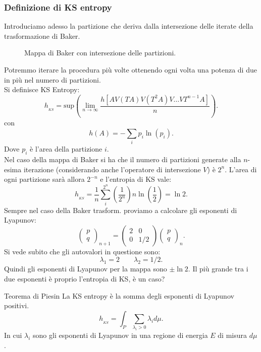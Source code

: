 \subsubsection{Definizione di KS entropy}%
\label{subsub:Definizione di KS entropy}
Introduciamo adesso la partizione che deriva dalla intersezione delle iterate della trasformazione di Baker.
\begin{figure}[H]
    \centering
    \caption{\scriptsize Mappa di Baker con intersezione delle partizioni.}
    \label{fig:21_def_E}
\end{figure}
\noindent
Potremmo iterare la procedura più volte ottenendo ogni volta una potenza di due in più nel numero di partizioni.\\
Si definisce  KS Entropy:
\[
h_{_{KS}} = \text{sup}\left( \lim_{n \to \infty} \frac{h\left[ AV(TA)V(T^2A)V\ldots VT^{n-1}A\right]}{n}\right)
.\] 
con 
\[
    h(A)=-\sum_{i}^{} p_i\ln (p_i)
.\] 
Dove $p_i$ è l'area della partizione $i$.\\
Nel caso della mappa di Baker si ha che il numero di partizioni generate alla $n$-esima iterazione (considerando anche l'operatore di intersezione $V$) è $2^{n}$. L'area di ogni partizione sarà allora $2^{-n}$ e l'entropia di KS vale:
\[
    h_{_{KS}} = \frac{1}{n}\sum_{i}^{2^{n}} \left(\frac{1}{2^{n}}\right)n\ln\left(\frac{1}{2}\right) = \ln 2
.\] 
Sempre nel caso della Baker trasform. proviamo a calcolare gli esponenti di Lyapunov: 
\[
    \begin{pmatrix} p \\ q \end{pmatrix}_{n+1} = 
    \begin{pmatrix} 
	2 & 0 \\
	0 & 1/2
    \end{pmatrix} 
    \begin{pmatrix} p \\ q \end{pmatrix}_n
.\] 
Si vede subito che gli autovalori in questione sono:
\[
    \lambda_1 = 2 \qquad \lambda_2 = 1 /2
.\] 
Quindi gli esponenti di Lyapunov per la mappa sono $\pm \ln 2$. Il più grande tra i due esponenti è proprio l'entropia di KS, è un caso?
\begin{redbox}{Teorema di Piesin}
    La KS entropy è la somma degli esponenti di Lyapunov positivi.
    \[
        h_{_{KS}} = \int_{P}^{} \sum_{\lambda_i >0}^{} \lambda_id\mu 
    .\] 
    In cui $\lambda_i$ sono gli esponenti di Lyapunov in una regione di energia $E$ di misura $d \mu$.
\end{redbox}
\noindent
